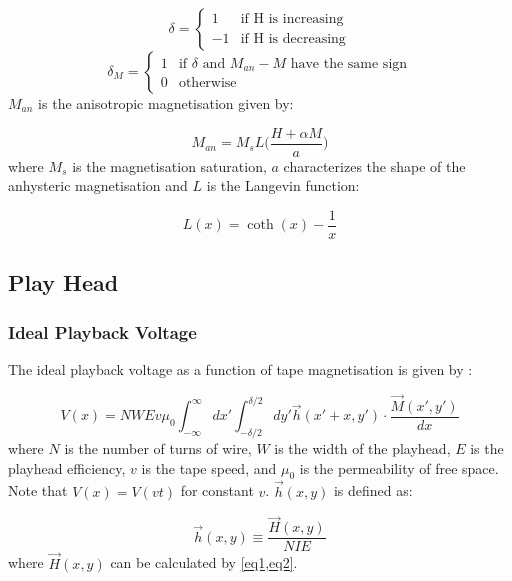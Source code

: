\documentclass[twoside,a4paper]{article}
\begin{document}
\begin{equation}
    \delta = \begin{cases}
        1 & \text{if H is increasing} \\
        -1 & \text{if H is decreasing}
    \end{cases}
\end{equation}
\begin{equation}
    \delta_M = \begin{cases}
        1 & \text{if $\delta$ and $M_{an} - M$ have the same sign} \\
        0 & \text{otherwise}
    \end{cases}
\end{equation}
%
$M_{an}$ is the anisotropic magnetisation given by:

\begin{equation}
    M_{an} = M_s L \Big( \frac{H + \alpha M}{a} \Big)
\end{equation}
%
where $M_s$ is the magnetisation saturation, $a$ characterizes the shape
of the anhysteric magnetisation and $L$ is the Langevin function:

\begin{equation}
    L(x) = \coth (x) - \frac{1}{x}
\end{equation}

\subsection{Play Head}
\subsubsection{Ideal Playback Voltage}
The ideal playback voltage as a function of tape magnetisation is given by
\cite{1994tmr..book.....B}:

\begin{equation}
    V(x) =  NWEv \mu_0 \int_{-\infty}^{\infty} dx' \int_{-\delta/2}^{\delta/2} dy' \vec{h}(x' + x, y') \cdot \frac{\vec{M}(x', y')}{dx}
    \label{eq11}
\end{equation}
%
where $N$ is the number of turns of wire, $W$ is the width of the playhead, $E$ is the playhead
efficiency, $v$ is the tape speed, and $\mu_0$ is the permeability of free space.
Note that $V(x) = V(vt)$ for constant $v$. $\vec{h}(x, y)$ is defined as:

\begin{equation}
    \vec{h} (x, y) \equiv \frac{\vec{H} (x, y)}{NIE}
    \label{eq12}
\end{equation}
%
where $\vec{H} (x, y)$ can be calculated by \cref{eq1,eq2}.
\end{document}
